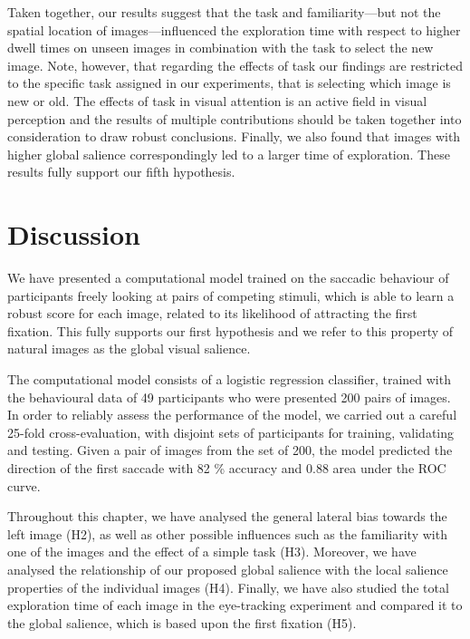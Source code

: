 {Taken together, our results suggest that the task and familiarity---but not the spatial location of images---influenced the exploration time with respect to higher dwell times on unseen images in combination with the task to select the new image. Note, however, that regarding the effects of task our findings are restricted to the specific task assigned in our experiments, that is selecting which image is new or old. The effects of task in visual attention is an active field in visual perception and the results of multiple contributions should be taken together into consideration to draw robust conclusions. Finally, we also found that images with higher global salience correspondingly led to a larger time of exploration. These results fully support our fifth hypothesis.

\section{Discussion}
\label{sec:discussion}

We have presented a computational model trained on the saccadic behaviour of participants freely looking at pairs of competing stimuli, which is able to learn a robust score for each image, related to its likelihood of attracting the first fixation. This fully supports our first hypothesis and we refer to this property of natural images as the global visual salience.

The computational model consists of a logistic regression classifier, trained with the behavioural data of 49 participants who were presented 200 pairs of images. In order to reliably assess the performance of the model, we carried out a careful 25-fold cross-evaluation, with disjoint sets of participants for training, validating and testing. Given a pair of images from the set of 200, the model predicted the direction of the first saccade with 82 \% accuracy and 0.88 area under the ROC curve.

Throughout this chapter, we have analysed the general lateral bias towards the left image (H2), as well as other possible influences such as the familiarity with one of the images and the effect of a simple task (H3). Moreover, we have analysed the relationship of our proposed global salience with the local salience properties of the individual images (H4). Finally, we have also studied the total exploration time of each image in the eye-tracking experiment and compared it to the global salience, which is based upon the first fixation (H5).

}
